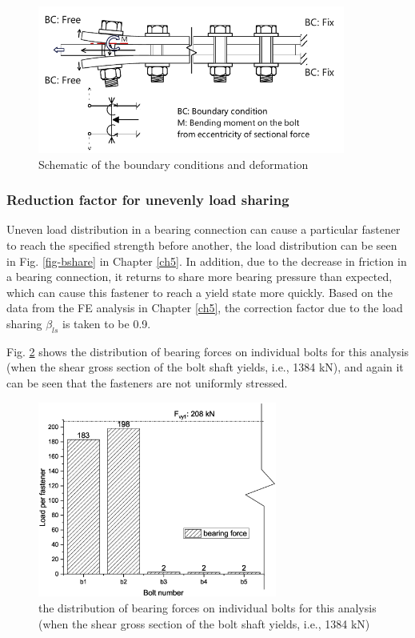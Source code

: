 \begin{figure}[htbp]
    \centering
    \includegraphics[width=0.9\textwidth]{imgs/ch7/bcschema.pdf}
    \caption{Schematic of the boundary conditions and deformation}
    \label{fig-bcsche}
\end{figure}


\subsubsection{Reduction factor for unevenly load sharing}

Uneven load distribution in a bearing connection can cause a particular fastener to reach the specified strength before another, the load distribution can be seen in Fig. \ref{fig-bshare} in Chapter \ref{ch5}. In addition, due to the decrease in friction in a bearing connection, it returns to share more bearing pressure than expected, which can cause this fastener to reach a yield state more quickly. Based on the data from the FE analysis in Chapter \ref{ch5}, the correction factor due to the load sharing $\beta_{ls}$ is taken to be 0.9.

Fig. \ref{fig-beals-b4} shows the distribution of bearing forces on individual bolts for this analysis (when the shear gross section of the bolt shaft yields, i.e., 1384 kN), and again it can be seen that the fasteners are not uniformly stressed.

\begin{figure}[htbp]
    \centering
    \includegraphics[width=0.7\textwidth]{imgs/ch7/beals-b4.eps}
    \caption{the distribution of bearing forces on individual bolts for this analysis (when the shear gross section of the bolt shaft yields, i.e., 1384 kN)}
    \label{fig-beals-b4}
\end{figure}

